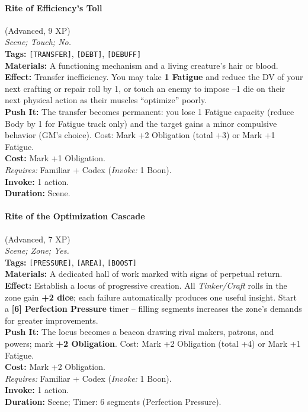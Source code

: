 \paragraph{Rite of Efficiency's Toll} (Advanced, 9 XP) \hfill \\
\emph{Scene; Touch; No.} \\
\textbf{Tags:} \texttt{[TRANSFER]}, \texttt{[DEBT]}, \texttt{[DEBUFF]} \\
\textbf{Materials:} A functioning mechanism and a living creature's hair or blood. \\
\textbf{Effect:} Transfer inefficiency. You may take \textbf{1 Fatigue} and reduce the DV of your next crafting or repair roll by 1, or touch an enemy to impose --1 die on their next physical action as their muscles ``optimize'' poorly. \\
\textbf{Push It:} The transfer becomes permanent: you lose 1 Fatigue capacity (reduce Body by 1 for Fatigue track only) and the target gains a minor compulsive behavior (GM's choice). Cost: Mark +2 Obligation (total +3) or Mark +1 Fatigue. \\
\textbf{Cost:} Mark +1 Obligation. \\
\textit{Requires:} Familiar + Codex (\textit{Invoke:} 1 Boon). \\
\textbf{Invoke:} 1 action. \\
\textbf{Duration:} Scene.

\paragraph{Rite of the Optimization Cascade} (Advanced, 7 XP) \hfill \\
\emph{Scene; Zone; Yes.} \\
\textbf{Tags:} \texttt{[PRESSURE]}, \texttt{[AREA]}, \texttt{[BOOST]} \\
\textbf{Materials:} A dedicated hall of work marked with signs of perpetual return. \\
\textbf{Effect:} Establish a locus of progressive creation. All \textit{Tinker/Craft} rolls in the zone gain \textbf{+2 dice}; each failure automatically produces one useful insight. Start a \textbf{[6] Perfection Pressure} timer -- filling segments increases the zone's demands for greater improvements. \\
\textbf{Push It:} The locus becomes a beacon drawing rival makers, patrons, and powers; mark \textbf{+2 Obligation}. Cost: Mark +2 Obligation (total +4) or Mark +1 Fatigue. \\
\textbf{Cost:} Mark +2 Obligation. \\
\textit{Requires:} Familiar + Codex (\textit{Invoke:} 1 Boon). \\
\textbf{Invoke:} 1 action. \\
\textbf{Duration:} Scene; Timer: 6 segments (Perfection Pressure).

